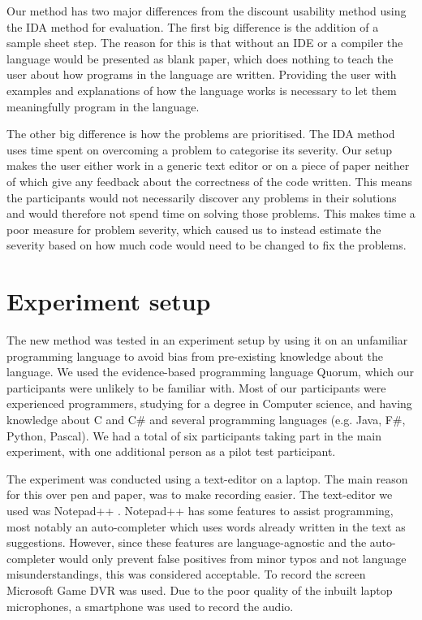 \documentclass[preprint,10pt]{sigplanconf}
\begin{document}
Our method has two major differences from the discount usability method using the IDA method for evaluation.
The first big difference is the addition of a sample sheet step. The reason for this is that without an IDE or a compiler the language would be presented as blank paper, which does nothing to teach the user about how programs in the language are written. Providing the user with examples and explanations of how the language works is necessary to let them meaningfully program in the language.

The other big difference is how the problems are prioritised. The IDA method uses time spent on overcoming a problem to categorise its severity. Our setup makes the user either work in a generic text editor or on a piece of paper neither of which give any feedback about the correctness of the code written. This means the participants would not necessarily discover any problems in their solutions and would therefore not spend time on solving those problems.
This makes time a poor measure for problem severity, which caused us to instead estimate the severity based on how much code would need to be changed to fix the problems.

\section{Experiment setup}
The new method was tested in an experiment setup by using it on an unfamiliar programming language to avoid bias from pre-existing knowledge about the language. 
We used the evidence-based programming language Quorum, which our participants were unlikely to be familiar with. Most of our participants were experienced programmers,  studying for a degree in Computer science, and having knowledge about C and C\# and several programming languages (e.g. Java, F\#, Python, Pascal). We had a total of six participants taking part in the main experiment, with one additional person as a pilot test participant.

The experiment was conducted using a text-editor on a laptop.
The main reason for this over pen and paper, was to make recording easier.
The text-editor we used was Notepad++ \cite{Notepad}.
Notepad++ has some features to assist programming, most notably an auto-completer which uses words already written in the text as suggestions.
However, since these features are language-agnostic and the auto-completer would only prevent false positives from minor typos and not language misunderstandings, this was considered acceptable.
To record the screen Microsoft Game DVR was used.
Due to the poor quality of the inbuilt laptop microphones, a smartphone was used to record the audio.
\end{document}
